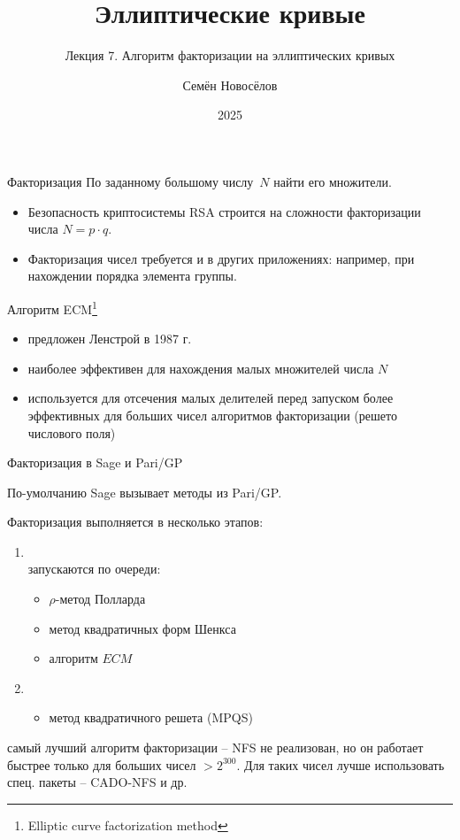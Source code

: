 \documentclass{beamer}
\title{Эллиптические кривые}
\subtitle{Лекция 7. Алгоритм факторизации на эллиптических кривых}
\author{Семён Новосёлов}
\institute{БФУ им. И. Канта}
\date{2025}
\begin{document}
\frame{\titlepage}

\begin{frame}{Факторизация}
	По заданному большому числу~$N$ найти его множители.

	\vspace{1em}

	\begin{itemize}
		\item Безопасность криптосистемы RSA строится на сложности факторизации числа $N = p \cdot q$.
		\vspace{0.5em}
		\item Факторизация чисел требуется и в других приложениях: например, при нахождении порядка элемента группы.
	\end{itemize}
\end{frame}

\begin{frame}{Алгоритм ECM\footnote{Elliptic curve factorization method}}
	\begin{itemize}
		\item предложен Ленстрой в 1987 г.
		\item наиболее эффективен для нахождения малых множителей числа $N$
		\item используется для отсечения малых делителей перед запуском более эффективных для больших чисел алгоритмов факторизации (решето числового поля)
	\end{itemize}
\end{frame}

\begin{frame}{Факторизация в Sage и Pari/GP}
	
	По-умолчанию Sage вызывает методы из Pari/GP.
	\vspace{1em}

	Факторизация выполняется в несколько этапов:
	\vspace{0.5em}
	\begin{enumerate}
		\item {}\\запускаются по очереди:
		\begin{itemize}
			\item $\rho$-метод Полларда
			\item метод квадратичных форм Шенкса
			\item алгоритм $ECM$
		\end{itemize}
		\vspace{0.5em}
		\item  {}
		\begin{itemize}
			\item метод квадратичного решета (MPQS)
		\end{itemize} 
	\end{enumerate}
	
	\vspace{3em}
	\begin{small}
		 самый лучший алгоритм факторизации -- NFS не реализован, но он работает быстрее только для больших чисел $> 2^{300}$. Для таких чисел лучше использовать спец. пакеты -- CADO-NFS и др.
	\end{small}
\end{frame}
\end{document}
